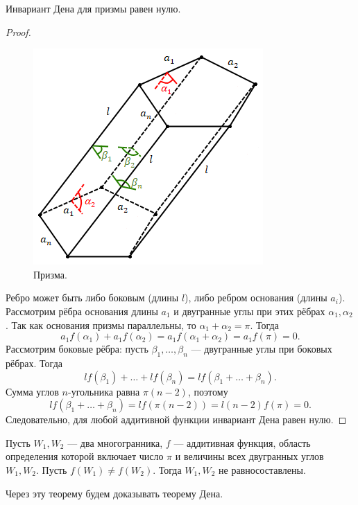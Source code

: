 \begin{statement}
    Инвариант Дена для призмы равен нулю.
\end{statement}
\begin{proof}
    \begin{figure}[htbp]
        \centering
        \includegraphics[scale=1]{images/c8.9.png}
        \caption{Призма.}
        \label{fig:c8.9}
    \end{figure}
    Ребро может быть либо боковым (длины $l$), либо ребром основания (длины $a_i$). Рассмотрим рёбра основания длины $a_1$ и двугранные углы при этих рёбрах $\alpha_1, \alpha_2$. Так как основания призмы параллельны, то $\alpha_1 + \alpha_2 = \pi$. Тогда
    \[a_1 f(\alpha_1) + a_1 f (\alpha_2) = a_1 f(\alpha_1 + \alpha_2) = a_1 f(\pi) = 0.\]
    Рассмотрим боковые рёбра: пусть $\beta_1, \dots, \beta_n$ — двугранные углы при боковых рёбрах. Тогда
    \[l f(\beta_1) + \dots + l f(\beta_n) = l f(\beta_1 + \dots + \beta_n).\]
    Сумма углов $n$-угольника равна $\pi(n-2)$, поэтому 
    \[l f(\beta_1 + \dots + \beta_n) = l f(\pi(n-2)) = l(n-2)f(\pi) = 0.\]
    Следовательно, для любой аддитивной функции инвариант Дена равен нулю. 
\end{proof} 

\begin{theorem}[Хадвигер]
    Пусть $W_1, W_2$ — два многогранника, $f$ — аддитивная функция, область определения которой включает число $\pi$ и величины всех двугранных углов $W_1, W_2$. Пусть $f(W_1) \neq f(W_2)$. Тогда $W_1, W_2$ не равносоставлены.
\end{theorem}

\begin{remark}
    Через эту теорему будем доказывать теорему Дена.
\end{remark}

